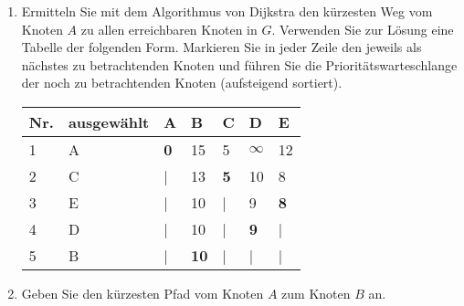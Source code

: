 \documentclass{lehramt-informatik-aufgabe}
\begin{document}
\begin{enumerate}


\item Ermitteln Sie mit dem Algorithmus von Dijkstra den kürzesten Weg
vom Knoten $A$ zu allen erreichbaren Knoten in $G$. Verwenden Sie zur
Lösung eine Tabelle der folgenden Form. Markieren Sie in jeder Zeile den
jeweils als nächstes zu betrachtenden Knoten und führen Sie die
Prioritätswarteschlange der noch zu betrachtenden Knoten (aufsteigend
sortiert).

\begin{tabular}{lllllll}
\bf{Nr.}        & \bf{ausgewählt} & \bf{A}          & \bf{B}          & \bf{C}          & \bf{D}          & \bf{E}          \\
\hline
1               & A               & \bf{0}          & 15              & 5               & $\infty$        & 12              \\
2               & C               & |               & 13              & \bf{5}          & 10              & 8               \\
3               & E               & |               & 10              & |               & 9               & \bf{8}          \\
4               & D               & |               & 10              & |               & \bf{9}          & |               \\
5               & B               & |               & \bf{10}         & |               & |               & |               \\
\end{tabular}


\item Geben Sie den kürzesten Pfad vom Knoten $A$ zum Knoten $B$ an.
\end{enumerate}
\end{document}
